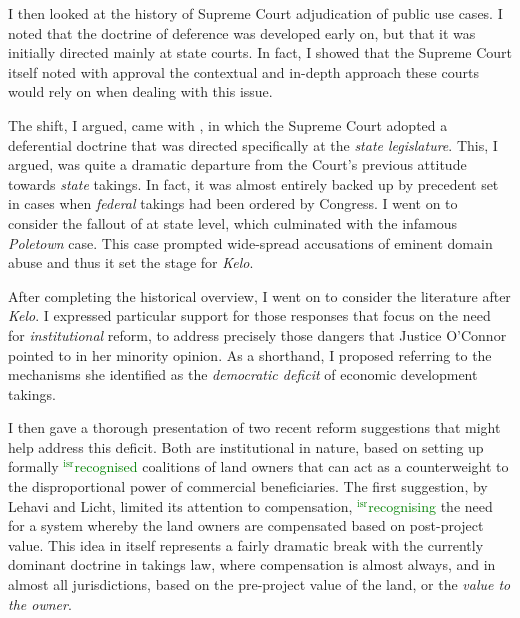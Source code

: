 \documentclass[12pt,a4paper]{book} %
\newcommand{\isr}[1]{\textcolor{green}{$^{\textrm{isr}}${#1}}}
\begin{document}
I then looked at the history of Supreme Court adjudication of public use cases. I noted that the doctrine of deference was developed early on, but that it was initially directed mainly at state courts. In fact, I showed that the Supreme Court itself noted with approval the contextual and in-depth approach these courts would rely on when dealing with this issue.

The shift, I argued, came with \textcite{berman54}, in which the Supreme Court adopted a deferential doctrine that was directed specifically at the {\it state legislature}. This, I argued, was quite a dramatic departure from the Court's previous attitude towards {\it state} takings. In fact, it was almost entirely backed up by precedent set in cases when {\it federal} takings had been ordered by Congress. I went on to consider the fallout of \textcite{berman84} at state level, which culminated with the infamous {\it Poletown} case. This case prompted wide-spread accusations of eminent domain abuse and thus it set the stage for {\it Kelo}.

After completing the historical overview, I went on to consider the literature after {\it Kelo}. I expressed particular support for those responses that focus on the need for {\it institutional} reform, to address precisely those dangers that Justice O'Connor pointed to in her minority opinion. As a shorthand, I proposed referring to the mechanisms she identified as the {\it democratic deficit} of economic development takings. 

I then gave a thorough presentation of two recent reform suggestions that might help address this deficit. Both are institutional in nature, based on setting up formally \isr{recognised} coalitions of land owners that can act as a counterweight to the disproportional power of commercial beneficiaries. The first suggestion, by Lehavi and Licht, limited its attention to compensation, \isr{recognising} the need for a system whereby the land owners are compensated based on post-project value.  This idea in itself represents a fairly dramatic break with the currently dominant doctrine in takings law, where compensation is almost always, and in almost all jurisdictions, based on the pre-project value of the land, or the {\it value to the owner}.
\end{document}
